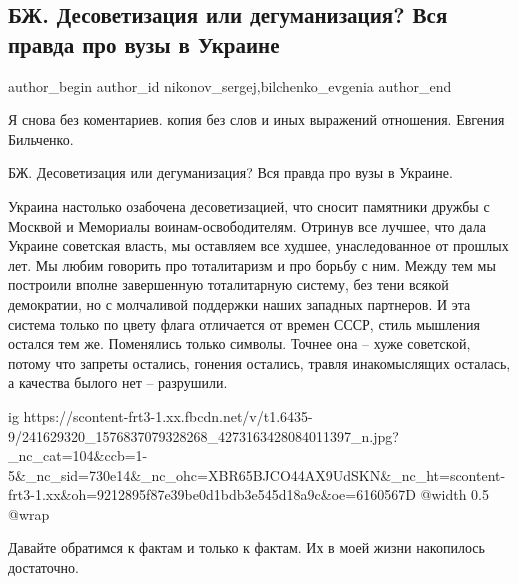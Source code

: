  
 
 
 
 
 
\subsection{БЖ. Десоветизация или дегуманизация? Вся правда про вузы в Украине}
\label{sec:08_09_2021.fb.nikonov_sergej.1.bilchenko_desovetizacia_dehumanizacia}
 
\ifcmt
 author_begin
   author_id nikonov_sergej,bilchenko_evgenia
 author_end
\fi

Я снова без коментариев. копия без слов и иных выражений отношения.
Евгения Бильченко.

БЖ. Десоветизация или дегуманизация? Вся правда про вузы в Украине.

Украина настолько озабочена десоветизацией, что сносит памятники дружбы с
Москвой и Мемориалы воинам-освободителям. Отринув все лучшее, что дала Украине
советская власть, мы оставляем все худшее, унаследованное от прошлых лет. Мы
любим говорить про тоталитаризм и про борьбу с ним. Между тем мы построили
вполне завершенную тоталитарную систему, без тени всякой демократии, но с
молчаливой поддержки наших западных партнеров. И эта система только по цвету
флага отличается от времен СССР, стиль мышления остался тем же. Поменялись
только символы. Точнее она – хуже советской, потому что запреты остались,
гонения остались, травля инакомыслящих осталась, а качества былого нет –
разрушили.

\ifcmt
  ig https://scontent-frt3-1.xx.fbcdn.net/v/t1.6435-9/241629320_1576837079328268_4273163428084011397_n.jpg?_nc_cat=104&ccb=1-5&_nc_sid=730e14&_nc_ohc=XBR65BJCO44AX9UdSKN&_nc_ht=scontent-frt3-1.xx&oh=9212895f87e39be0d1bdb3e545d18a9c&oe=6160567D
  @width 0.5
  @wrap \parpic[r]
\fi

Давайте обратимся к фактам и только к фактам. Их в моей жизни накопилось
достаточно.

